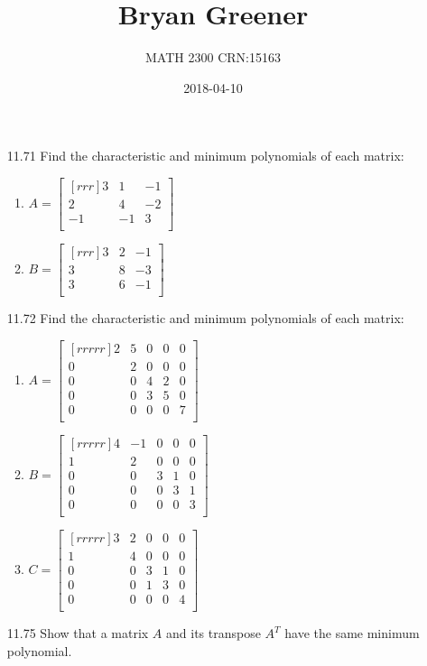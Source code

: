 \documentclass[12pt]{article}
\title{Bryan Greener}
\author{MATH 2300 CRN:15163}
\date{2018-04-10}
\theoremstyle{definition}
\theoremstyle{plain}
\begin{document}
\maketitle

\TabPositions{4cm}

\begin{enumerate}
\item[11.71]Find the characteristic and minimum polynomials of each matrix:
	\begin{enumerate}
	\item $A=\begin{bmatrix}[rrr]3&1&-1\\2&4&-2\\-1&-1&3\\\end{bmatrix}$
	\item $B=\begin{bmatrix}[rrr]3&2&-1\\3&8&-3\\3&6&-1\\\end{bmatrix}$
	\end{enumerate}
\item[11.72]Find the characteristic and minimum polynomials of each matrix:
	\begin{enumerate}
	\item $A=\begin{bmatrix}[rrrrr]2&5&0&0&0\\0&2&0&0&0\\0&0&4&2&0\\0&0&3&5&0\\0&0&0&0&7\\\end{bmatrix}$
	\item $B=\begin{bmatrix}[rrrrr]4&-1&0&0&0\\1&2&0&0&0\\0&0&3&1&0\\0&0&0&3&1\\0&0&0&0&3\\\end{bmatrix}$
	\item $C=\begin{bmatrix}[rrrrr]3&2&0&0&0\\1&4&0&0&0\\0&0&3&1&0\\0&0&1&3&0\\0&0&0&0&4\\\end{bmatrix}$
	\end{enumerate}
\item[11.75]Show that a matrix $A$ and its transpose $A^T$ have the same minimum polynomial.


\end{enumerate}
\end{document}
